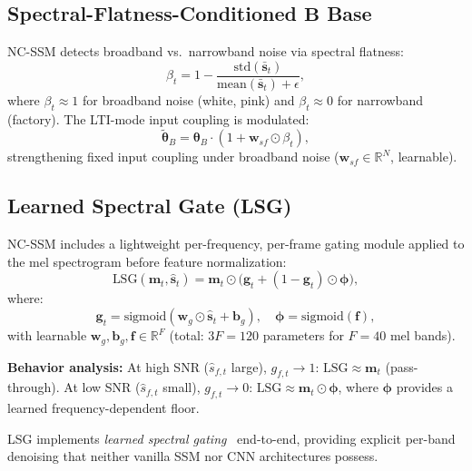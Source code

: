 \documentclass[journal]{IEEEtran}
\begin{document}
\subsection{Spectral-Flatness-Conditioned $\mathbf{B}$ Base}

NC-SSM detects broadband vs.\ narrowband noise via spectral flatness:
\begin{equation}
\beta_t = 1 - \frac{\text{std}(\bar{\mathbf{s}}_t)}{\text{mean}(\bar{\mathbf{s}}_t) + \epsilon},
\label{eq:broadband}
\end{equation}
where $\beta_t \approx 1$ for broadband noise (white, pink) and $\beta_t \approx 0$ for narrowband (factory).
The LTI-mode input coupling is modulated:
\begin{equation}
\tilde{\bm{\theta}}_B = \bm{\theta}_B \cdot (1 + \mathbf{w}_{sf} \odot \beta_t),
\label{eq:sf_B}
\end{equation}
strengthening fixed input coupling under broadband noise ($\mathbf{w}_{sf} \in \mathbb{R}^N$, learnable).

\subsection{Learned Spectral Gate (LSG)}
\label{sec:lsg}

NC-SSM includes a lightweight per-frequency, per-frame gating module applied to the mel spectrogram before feature normalization:
\begin{equation}
\text{LSG}(\mathbf{m}_t, \hat{\mathbf{s}}_t) = \mathbf{m}_t \odot \big(\mathbf{g}_t + (1{-}\mathbf{g}_t) \odot \bm{\phi}\big),
\label{eq:lsg}
\end{equation}
where:
\begin{equation}
\mathbf{g}_t = \text{sigmoid}(\mathbf{w}_g \odot \hat{\mathbf{s}}_t + \mathbf{b}_g), \quad
\bm{\phi} = \text{sigmoid}(\mathbf{f}),
\label{eq:lsg_gate}
\end{equation}
with learnable $\mathbf{w}_g, \mathbf{b}_g, \mathbf{f} \in \mathbb{R}^F$ (total: $3F = 120$ parameters for $F{=}40$ mel bands).

\smallskip\noindent\textbf{Behavior analysis:}
At high SNR ($\hat{s}_{f,t}$ large), $g_{f,t} \to 1$: $\text{LSG} \approx \mathbf{m}_t$ (pass-through).
At low SNR ($\hat{s}_{f,t}$ small), $g_{f,t} \to 0$: $\text{LSG} \approx \mathbf{m}_t \odot \bm{\phi}$, where $\bm{\phi}$ provides a learned frequency-dependent floor.

LSG implements \emph{learned spectral gating}~\cite{ephraim1984speech} end-to-end, providing explicit per-band denoising that neither vanilla SSM nor CNN architectures possess.
\end{document}

